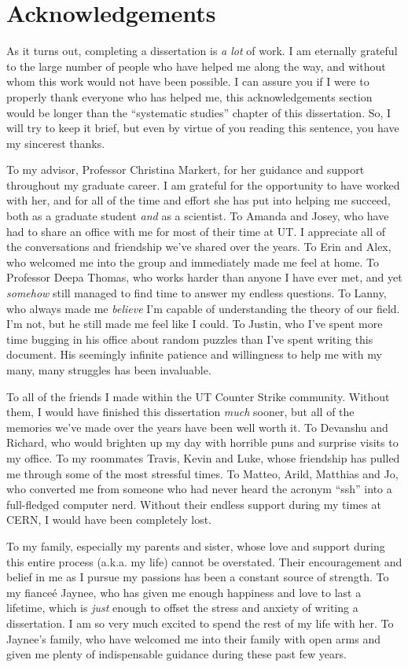 \chapter{Acknowledgements}

\footnotesize
As it turns out, completing a dissertation is \textit{a lot} of work. I am eternally grateful to the large number of people who have helped me along the way, and without whom this work would not have been possible. I can assure you if I were to properly thank everyone who has helped me, this acknowledgements section would be longer than the ``systematic studies'' chapter of this dissertation. So, I will try to keep it brief, but even by virtue of you reading this sentence, you have my sincerest thanks.

To my advisor, Professor Christina Markert, for her guidance and support throughout my graduate career. I am grateful for the opportunity to have worked with her, and for all of the time and effort she has put into helping me succeed, both as a graduate student \textit{and} as a scientist. To Amanda and Josey, who have had to share an office with me for most of their time at UT. I appreciate all of the conversations and friendship we've shared over the years. To Erin and Alex, who welcomed me into the group and immediately made me feel at home. To Professor Deepa Thomas, who works harder than anyone I have ever met, and yet \textit{somehow} still managed to find time to answer my endless questions. To Lanny, who always made me \textit{believe} I'm capable of understanding the theory of our field. I'm not, but he still made me feel like I could. To Justin, who I've spent more time bugging in his office about random puzzles than I've spent writing this document. His seemingly infinite patience and willingness to help me with my many, many struggles has been invaluable.

To all of the friends I made within the UT Counter Strike community. Without them, I would have finished this dissertation \textit{much} sooner, but all of the memories we've made over the years have been well worth it. To Devanshu and Richard, who would brighten up my day with horrible puns and surprise visits to my office. To my roommates Travis, Kevin and Luke, whose friendship has pulled me through some of the most stressful times. To Matteo, Arild, Matthias and Jo, who converted me from someone who had never heard the acronym ``ssh'' into a full-fledged computer nerd. Without their endless support during my times at CERN, I would have been completely lost. 

To my family, especially my parents and sister, whose love and support during this entire process (a.k.a. my life) cannot be overstated. Their encouragement and belief in me as I pursue my passions has been a constant source of strength. To my fiance\'e Jaynee, who has given me enough happiness and love to last a lifetime, which is \textit{just} enough to offset the stress and anxiety of writing a dissertation. I am so very much excited to spend the rest of my life with her. To Jaynee's family, who have welcomed me into their family with open arms and given me plenty of indispensable guidance during these past few years.

\normalsize